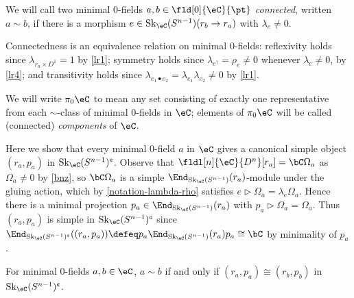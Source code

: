 \documentclass[12pt,reqno]{amsart}
\newcommand{\Sk}{\mathrm{Sk}}
\newcommand{\C}{\eC}
\newcommand{\blt}{\bullet}
\newcommand{\defn}[1]{\emph{#1}}
\newcommand{\cent}{\textup{\textcent}}
\begin{document}
\begin{definition}\label{cnd0fld}
We will call two minimal 0-fields $a,b\in\fld[0]{\C}{\pt}$ \defn{connected}, written $a\sim b$, if there is a morphism $e\in\Sk_\C(S^{n-1})(r_b\to r_a)$ with $\lambda_e\neq0$.
\end{definition}

\begin{remark}
\label{rmk:DLcomponents}
Connectedness is an equivalence relation on minimal 0-fields: reflexivity holds since $\lambda_{r_a\times D^1}=1$ by \ref{lr1}; symmetry holds since $\lambda_{e^\dag}=\rho_e\neq0$ whenever $\lambda_e\neq0$, by \ref{lr4}; and transitivity holds since $\lambda_{e_1\blt e_2}=\lambda_{e_1}\lambda_{e_2}\neq0$ by \ref{lr1}. 

We will write $\pi_0\C$ to mean any set consisting of exactly one representative from each $\sim$-class of minimal 0-fields in $\C$; elements of $\pi_0\C$ will be called (connected) \defn{components} of $\C$.
\end{remark}

\begin{remark}
\label{rem:minimal-0-field-simple-object}
  Here we show that every minimal 0-field $a$ in $\C$ gives a canonical simple object $(r_a, p_a)$ in $\Sk_\C(S^{n-1})^\cent$. Observe that $\fldl[n]{\C}{D^n}[ r_a] = \bC \Omega_a$ as $\Omega_a \neq 0$ by \cref{bnz}, so $\bC \Omega_a$ is a simple $\End_{\Sk_\C(S^{n-1})}(r_a)$-module under the gluing action, which by \cref{notation-lambda-rho} satisfies $e \triangleright \Omega_a = \lambda_e \Omega_a$. Hence there is a minimal projection $p_a \in \End_{\Sk_\C(S^{n-1})}(r_a)$ with $p_a \triangleright \Omega_a = \Omega_a$. Thus $(r_a, p_a)$ is simple in $\Sk_\C(S^{n-1})^\cent$ since $\End_{\Sk_\C(S^{n-1})^\cent}((r_a,p_a))\defeq p_a \End_{\Sk_\C(S^{n-1})}(r_a) p_a \cong \bC$ by minimality of $p_a$.
\end{remark}

\begin{lemma}\label{lem:connected-iff-isomorphic}
  For minimal 0-fields $a, b \in \C$, $a \sim b$ if and only if $(r_a, p_a) \cong (r_b, p_b)$ in $\Sk_\C(S^{n-1})^\cent$.
\end{lemma}
\end{document}
